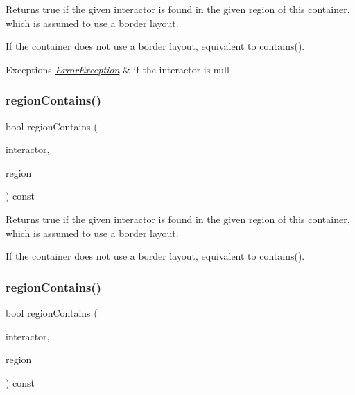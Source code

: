 Returns true if the given interactor is found in the given region of this container, which is assumed to use a border layout. 

If the container does not use a border layout, equivalent to \mbox{\hyperlink{classGContainer_a29e67f98cd36414c67475b8941d861a6}{contains()}}. 
\begin{DoxyExceptions}{Exceptions}
{\em \mbox{\hyperlink{classErrorException}{Error\+Exception}}} & if the interactor is null \\
\hline
\end{DoxyExceptions}
\mbox{\label{classGContainer_aa4cf95952747fd421a2b005eedbc662c}} 
\subsubsection{\texorpdfstring{region\+Contains()}{regionContains()}\hspace{0.1cm}{\footnotesize\ttfamily [3/4]}}
{\footnotesize\ttfamily bool region\+Contains (\begin{DoxyParamCaption}\item[{\mbox{\hyperlink{classGInteractor}{G\+Interactor}} \&}]{interactor,  }\item[{\mbox{\hyperlink{classGContainer_a81a01a86de31071a92e6cce0bab9bc4b}{G\+Container\+::\+Region}}}]{region }\end{DoxyParamCaption}) const\hspace{0.3cm}{\ttfamily [virtual]}}



Returns true if the given interactor is found in the given region of this container, which is assumed to use a border layout. 

If the container does not use a border layout, equivalent to \mbox{\hyperlink{classGContainer_a29e67f98cd36414c67475b8941d861a6}{contains()}}. \mbox{\label{classGContainer_ad67deacd62d3248fbe57ccbd4e96fb50}} 
\subsubsection{\texorpdfstring{region\+Contains()}{regionContains()}\hspace{0.1cm}{\footnotesize\ttfamily [4/4]}}
{\footnotesize\ttfamily bool region\+Contains (\begin{DoxyParamCaption}\item[{\mbox{\hyperlink{classGInteractor}{G\+Interactor}} \&}]{interactor,  }\item[{const std\+::string \&}]{region }\end{DoxyParamCaption}) const\hspace{0.3cm}{\ttfamily [virtual]}}



